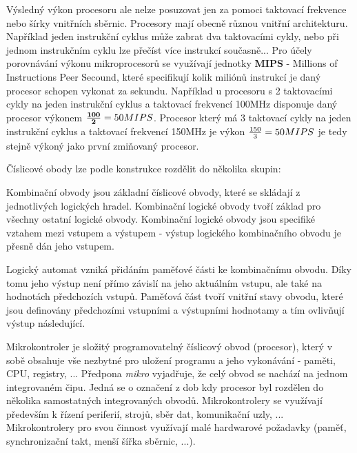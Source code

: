 Výsledný výkon procesoru ale nelze posuzovat jen za pomoci taktovací frekvence nebo šírky vnitřních sběrnic. Procesory mají obecně různou vnitřní architekturu. Například jeden instrukční cyklus může zabrat dva taktovacími cykly, nebo při jednom instrukčním cyklu lze přečíst více instrukcí současně... Pro účely porovnávání výkonu mikroprocesorů se využívají jednotky {\bf MIPS} - Millions of Instructions Peer Secound, které specifikují kolik miliónů instrukcí je daný procesor schopen vykonat za sekundu. Například u procesoru s 2 taktovacími cykly na jeden instrukční cyklus a taktovací frekvencí 100MHz disponuje daný procesor výkonem ${\bf 100\over 2} = 50 MIPS$. Procesor který má 3 taktovací cykly na jeden instrukční cyklus a taktovací frekvencí 150MHz je výkon ${150\over 3} = 50 MIPS$ je tedy stejně výkoný jako první zmiňovaný procesor.


Číslicové obody lze podle konstrukce rozdělit do několika skupin:

\vskip 4mm
\vskip 4mm
 

Kombinační obvody jsou základní číslicové obvody, které se skládají z jednotlivých logických hradel. Kombinační logické obvody tvoří základ pro všechny ostatní logické obvody. Kombinační logické obvody jsou specifiké vztahem mezi vstupem a výstupem - výstup logického kombinačního obvodu je přesně dán jeho vstupem.


Logický automat vzniká přidáním paměťové části ke kombinačnímu obvodu. Díky tomu jeho výstup není přímo závislí na jeho aktuálním vstupu, ale také na hodnotách předchozích vstupů. Paměťová část tvoří vnitřní stavy obvodu, které jsou definovány předchozími vstupními a výstupními hodnotamy a tím ovlivňují výstup následující. 


Mikrokontroler je složitý programovatelný číslicový obvod (procesor), který v sobě obsahuje vše nezbytné pro uložení programu a jeho vykonávání - paměti, CPU, registry, ... Předpona {\it mikro} vyjadřuje, že celý obvod se nachází na jednom integrovaném čipu. Jedná se o označení z dob kdy procesor byl rozdělen do několika samostatných integrovaných obvodů. Mikrokontrolery se využívají především k řízení periferií, strojů, sběr dat, komunikační uzly, ... Mikrokontrolery pro svou činnost využívají malé hardwarové požadavky (paměť, synchronizační takt, menší šířka sběrnic, ...).


